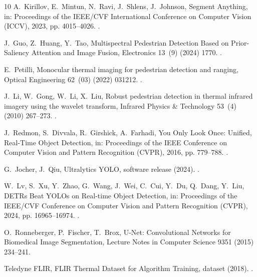 \begin{thebibliography}{10}
A.~Kirillov, E.~Mintun, N.~Ravi, J.~Shlens, J.~Johnson, {Segment Anything}, in:
  Proceedings of the IEEE/CVF International Conference on Computer Vision
  (ICCV), 2023, pp. 4015--4026.
\newblock \href {https://doi.org/10.1109/ICCV51070.2023.00371}
  {}.

J.~Guo, Z.~Huang, Y.~Tao, {Multispectral Pedestrian Detection Based on
  Prior-Saliency Attention and Image Fusion}, Electronics 13~(9) (2024) 1770.
\newblock \href {https://doi.org/10.3390/electronics13091770}
  {}.

E.~Petilli, {Monocular thermal imaging for pedestrian detection and ranging},
  Optical Engineering 62~(03) (2022) 031212.
\newblock \href {https://doi.org/10.1117/1.OE.62.3.031212}
  {}.

J.~Li, W.~Gong, W.~Li, X.~Liu, {Robust pedestrian detection in thermal infrared
  imagery using the wavelet transform}, Infrared Physics \& Technology 53~(4)
  (2010) 267--273.
\newblock \href {https://doi.org/10.1016/j.infrared.2010.03.005}
  {}.

J.~Redmon, S.~Divvala, R.~Girshick, A.~Farhadi, {You Only Look Once: Unified,
  Real-Time Object Detection}, in: Proceedings of the IEEE Conference on
  Computer Vision and Pattern Recognition (CVPR), 2016, pp. 779--788.
\newblock \href {https://doi.org/10.1109/CVPR.2016.91}
  {}.

G.~Jocher, J.~Qiu, {Ultralytics YOLO}, software release (2024).
\newblock \href {https://github.com/ultralytics/ultralytics}
  {}.

W.~Lv, S.~Xu, Y.~Zhao, G.~Wang, J.~Wei, C.~Cui, Y.~Du, Q.~Dang, Y.~Liu,
  {DETRs Beat YOLOs on Real-time Object Detection}, in: Proceedings of the
  IEEE/CVF Conference on Computer Vision and Pattern Recognition (CVPR), 2024,
  pp. 16965--16974.
\newblock \href {https://doi.org/10.1109/CVPR52733.2024.01605}
  {}.

O.~Ronneberger, P.~Fischer, T.~Brox, {U-Net: Convolutional Networks for
  Biomedical Image Segmentation}, Lecture Notes in Computer Science 9351 (2015)
  234--241\newblock \href {https://doi.org/10.1007/978-3-319-24574-4_28}
  {}.

Teledyne FLIR, {FLIR Thermal Dataset for Algorithm Training}, dataset (2018).
\newblock \href {https://www.flir.com/oem/adas/adas-dataset-form/}
  {}.

\end{thebibliography}
